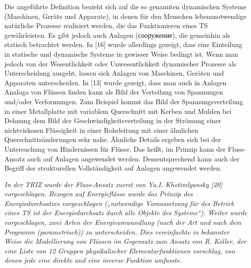 \documentclass[11pt,a4paper]{article}
\begin{document}
Die angeführte Definition bezieht sich auf die so genannten dynamischen
Systeme (Maschinen, Geräte und Apparate), in denen für den Menschen
lebensnotwendige natürliche Prozesse realisiert werden, die das Funktionieren
eines TS gewährleisten. Es gibt jedoch auch Anlagen
(\foreignlanguage{russian}{сооружение}), die gemeinhin als statisch betrachtet
werden.  In [16] wurde allerdings gezeigt, dass eine Einteilung in statische
und dynamische Systeme in gewisser Weise bedingt ist.  Wenn man jedoch von der
Wesentlichkeit oder Unwesentlichkeit dynamischer Prozesse als Unterscheidung
ausgeht, lassen sich Anlagen von Maschinen, Geräten und Apparaten
unterscheiden.  In [13] wurde gezeigt, dass man auch in Anlagen Analoga von
Flüssen finden kann als Bild der Verteilung von Spannungen und/oder
Verformungen.  Zum Beispiel kommt das Bild der Spannungsverteilung in einer
Metallplatte mit variablem Querschnitt mit Kerben und Mulden bei Dehnung dem
Bild der Geschwindigkeitsverteilung in der Strömung einer nichtviskosen
Flüssigkeit in einer Rohrleitung mit einer ähnlichen Querschnittsänderungen
sehr nahe. Ähnliche Details ergeben sich bei der Untersuchung von Hindernissen
für Flüsse.  Das heißt, im Prinzip kann der Fluss-Ansatz auch auf Anlagen
angewendet werden. Dementsprechend kann auch der Begriff der strukturellen
Vollständigkeit auf Anlagen angewendet werden.

\emph{In der TRIZ wurde der Fluss-Ansatz zuerst von Yu.I. Khotimlyansky [20]
  vorgeschlagen. Bezogen auf Energieflüsse wurde das Prinzip des
  Energiedurchsatzes vorgeschlagen („notwendige Voraussetzung für des Betrieb
  eines TS ist der Energiedurchsatz durch alle Objekte des Systems“).  Weiter
  wurde vorgeschlagen, zwei Arten der Energieumwandlung (nach der Art und nach
  dem Programm (parametrisch)) zu unterscheiden.  Dies vereinfachte in
  bekannter Weise die Modellierung von Flüssen im Gegensatz zum Ansatz von
  R. Koller, der eine Liste von 12 Gruppen physikalischer Elementarfunktionen
  vorschlug, von denen jede eine direkte und eine inverse Funktion umfasste.}
\end{document}
